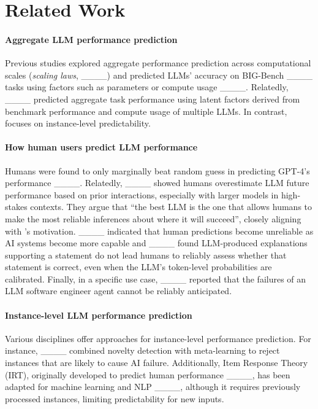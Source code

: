 \section{Related Work}
\label{sec:related_works}

\paragraph{Aggregate LLM performance prediction} Previous studies explored aggregate performance prediction across computational scales (\textit{scaling laws}, ____) and predicted  LLMs' accuracy on BIG-Bench ____ tasks using factors such as parameters or compute usage ____. Relatedly, ____ %
predicted aggregate task performance using latent factors derived from benchmark performance and compute usage of multiple LLMs. 
In contrast, \predbench focuses on instance-level predictability.

\paragraph{How human users predict LLM performance}
Humans were found 
to only marginally beat random guess in predicting GPT-4's performance ____. 
Relatedly, ____ showed humans overestimate LLM future performance based on prior interactions, especially with larger models in high-stakes contexts. They argue that ``the best LLM is the one that allows humans to make the most reliable inferences about where it will succeed'', closely aligning with \predbench's motivation. ____ indicated that human predictions become unreliable as AI systems become more capable 
and ____ found LLM-produced explanations supporting a statement do not lead humans to reliably assess whether that statement is correct, even when the LLM's token-level probabilities are calibrated. %
Finally, in a specific use case, ____ reported that the failures of an LLM software engineer agent cannot be reliably anticipated.

\paragraph{Instance-level LLM performance prediction}
Various disciplines offer approaches for instance-level performance prediction. For instance, ____ combined novelty detection with meta-learning to reject instances that are likely to cause %
AI failure. Additionally, Item Response Theory (IRT), originally developed to predict human performance %
____, has been adapted for machine learning and NLP ____, although it requires previously processed instances, limiting predictability for new inputs. %


